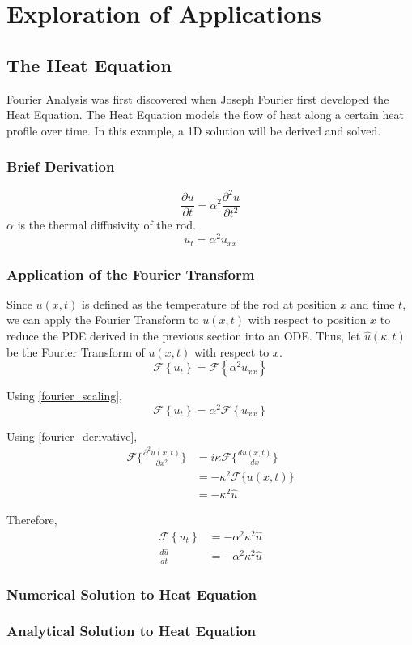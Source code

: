 \section{Exploration of Applications}
\subsection{The Heat Equation}
Fourier Analysis was first discovered when Joseph Fourier first developed the Heat Equation. The Heat Equation models the flow of heat along a certain heat profile over time. In this example, a 1D solution will be derived and solved.

\subsubsection{Brief Derivation}


\[ \frac{\partial u}{\partial t} = \alpha^2 \frac{\partial^2 u}{\partial t^2} \]
\noindent
\(\alpha\) is the thermal diffusivity of the rod.
\[ u_t = \alpha^2 u_{xx} \]

\subsubsection{Application of the Fourier Transform}
Since \(u(x,t)\) is defined as the temperature of the rod at position \(x\) and time \(t\), we can apply the Fourier Transform to \(u(x,t)\) with respect to position \(x\) to reduce the PDE derived in the previous section into an ODE. Thus, let \(\hat{u}(\kappa,t)\) be the Fourier Transform of \(u(x,t)\) with respect to \(x\).
\begin{equation}
    \mathcal{F} \left\{ u_t \right\} = \mathcal{F} \left\{ \alpha^2 u_{xx} \right\}
\end{equation}

Using \cref{fourier_scaling},
\begin{equation}
    \mathcal{F} \left\{ u_t \right\} = \alpha^2 \mathcal{F} \left\{ u_{xx} \right\}
\end{equation}

Using \cref{fourier_derivative},
    \begin{align}
        \mathcal{F}\{ \frac{\partial^2 u(x, t)}{\partial x^2} \} & = i \kappa \mathcal{F}\{ \frac{d u(x, t)}{dx} \} \\
        & = -\kappa^2 \mathcal{F}\{ u(x, t) \} \\
        & = -\kappa^2 \hat{u}
    \end{align}

Therefore,
\begin{align}
    \mathcal{F} \left\{ u_t \right\} &= -\alpha^2 \kappa^2 \hat{u} \\
    \frac{d \hat{u}}{dt} &= -\alpha^2 \kappa^2 \hat{u}
\end{align}


\subsubsection{Numerical Solution to Heat Equation}

\subsubsection{Analytical Solution to Heat Equation}
